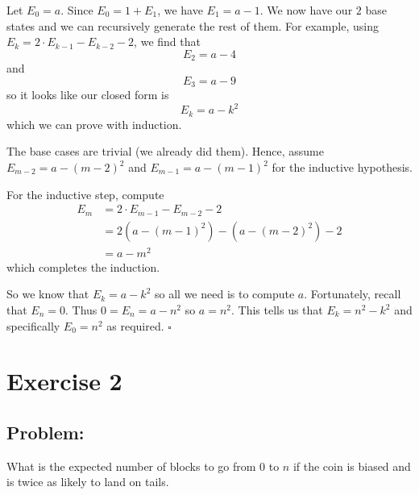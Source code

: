 \documentclass{article}
\begin{document}
Let $E_0=a$. Since $E_0=1+E_1$, we have $E_1=a-1$. We now have our $2$ base states and we can recursively generate the rest of them. For example, using $E_{k}=2\cdot E_{k-1}-E_{k-2}-2$, we find that $$E_2=a-4$$ and $$E_3=a-9$$ so it looks like our closed form is $$E_k=a-k^2$$ which we can prove with induction. 

The base cases are trivial (we already did them). Hence, assume $E_{m-2}=a-(m-2)^2$ and $E_{m-1}=a-(m-1)^2$ for the inductive hypothesis. 

For the inductive step, compute 
\begin{align*} 
E_m&= 2\cdot E_{m-1}-E_{m-2}-2\\
&=2(a-(m-1)^2)-(a-(m-2)^2)-2\\
&= a-m^2
\end{align*}
which completes the induction. 

So we know that $E_k=a-k^2$ so all we need is to compute $a$. Fortunately, recall that $E_n=0$. Thus $0=E_n=a-n^2$ so $a=n^2$. This tells us that $E_k=n^2-k^2$ and specifically $\boxed{E_0=n^2}$ as required.
$\square$

\section{Exercise 2}

\subsection{Problem:} What is the expected number of blocks to go from $0$ to $n$ if the coin is biased and is twice as likely to land on tails.
\end{document}
